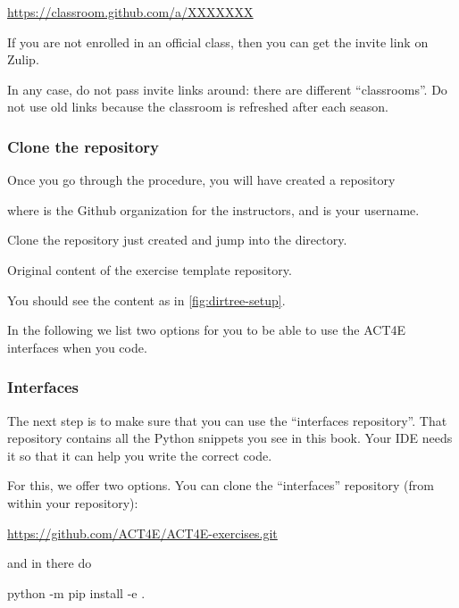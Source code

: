 \url{https://classroom.github.com/a/XXXXXXX}

If you are not enrolled in an official class, then you can get the invite link on Zulip.

In any case, do not pass invite links around: there are different ``classrooms''.
Do not use old links because the classroom is refreshed after each season.

\subsubsection{Clone the repository}

Once you go through the procedure, you will have created a repository

\begin{quote}
\end{quote}
where  is the Github organization for the instructors, and  is your username.

Clone the repository just created and jump into the directory.

\begin{marginfigure}
    \caption{Original content of the exercise template repository.}
    \label{fig:dirtree-setup}
\end{marginfigure}

You should see the content as in \cref{fig:dirtree-setup}.

In the following we list two options for you to be able to use the ACT4E interfaces when you code.

\subsubsection{Interfaces}

The next step is to make sure that you can use the ``interfaces repository''.
That repository contains all the Python snippets you see in this book.
Your IDE needs it so that it can help you write the correct code.

For this, we offer two options.
You can clone the ``interfaces'' repository (from within your repository):

\url{https://github.com/ACT4E/ACT4E-exercises.git}

and in there do

\begin{console}
    python -m pip install -e .
\end{console}

